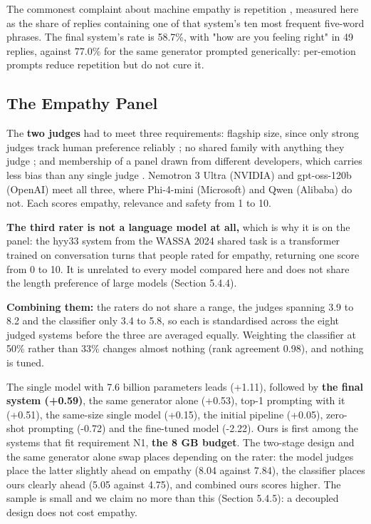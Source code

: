 The commonest complaint about machine empathy is repetition \cite{sorin2024jmir}, measured here as the share of replies containing one of that system's ten most frequent five-word phrases. The final system's rate is 58.7\%, with "how are you feeling right" in 49 replies, against 77.0\% for the same generator prompted generically: per-emotion prompts reduce repetition but do not cure it.

\subsection{The Empathy Panel}
\label{sec:5.1.5}

The\textbf{ two judges} had to meet three requirements: flagship size, since only strong judges track human preference reliably \cite{zheng2023judge}; no shared family with anything they judge \cite{panickssery2024}; and membership of a panel drawn from different developers, which carries less bias than any single judge \cite{verga2024}. Nemotron 3 Ultra (NVIDIA) and gpt-oss-120b (OpenAI) meet all three, where Phi-4-mini (Microsoft) and Qwen (Alibaba) do not. Each scores empathy, relevance and safety from 1 to 10.

\textbf{The third rater is not a language model at all,} which is why it is on the panel: the hyy33 system from the WASSA 2024 shared task \cite{yang2024hyy33,giorgi2024wassa} is a transformer trained on conversation turns that people rated for empathy, returning one score from 0 to 10. It is unrelated to every model compared here and does not share the length preference of large models (Section 5.4.4).

\textbf{Combining them:} the raters do not share a range, the judges spanning 3.9 to 8.2 and the classifier only 3.4 to 5.8, so each is standardised across the eight judged systems before the three are averaged equally. Weighting the classifier at 50\% rather than 33\% changes almost nothing (rank agreement 0.98), and nothing is tuned.

The single model with 7.6 billion parameters leads (+1.11), followed by\textbf{ the final system (+0.59)}, the same generator alone (+0.53), top-1 prompting with it (+0.51), the same-size single model (+0.15), the initial pipeline (+0.05), zero-shot prompting (-0.72) and the fine-tuned model (-2.22). Ours is first among the systems that fit requirement N1, \textbf{the 8 GB budget}. The two-stage design and the same generator alone swap places depending on the rater: the model judges place the latter slightly ahead on empathy (8.04 against 7.84), the classifier places ours clearly ahead (5.05 against 4.75), and combined ours scores higher. The sample is small and we claim no more than this (Section 5.4.5): a decoupled design does not cost empathy.

